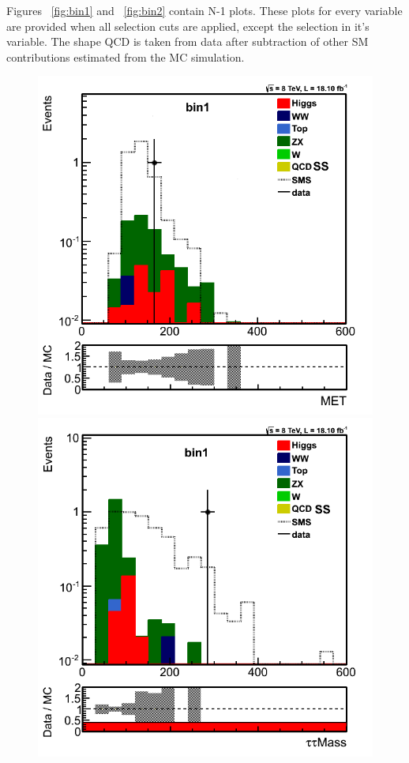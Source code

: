 Figures ~\ref{fig:bin1} and ~\ref{fig:bin2} contain N-1 plots. These plots for every variable are provided when all selection cuts are applied, except the selection in it's variable.
The shape QCD is taken from data after subtraction of other SM contributions
estimated from the MC simulation.

\begin{figure}[!Hhtb]
\centering
\includegraphics[angle=0,scale=0.35]{TauTauFigs/met_bin1_14nov.png}
\includegraphics[angle=0,scale=0.35]{TauTauFigs/zveto_bin1_14nov.png}

\end{figure}
